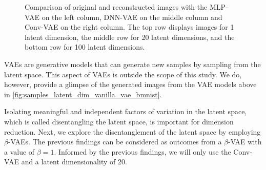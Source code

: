 \begin{figure}[!htb]
\qquad
{}
\caption{Comparison of original and reconstructed images with the MLP-VAE on the left column, DNN-VAE on the middle column and Conv-VAE on the right column. The top row displays images for 1 latent dimension, the middle row for 20 latent dimensions, and the bottom row for 100 latent dimensions.}
\label{fig:recon_latent_dim_vanilla_vae_bmnist}
\end{figure}

VAEs are generative models that can generate new samples by sampling from the latent space. This aspect of VAEs is outside the scope of this study. We do, however, provide a glimpse of the generated images from the VAE models above in \autoref{fig:samples_latent_dim_vanilla_vae_bmnist}.

\FloatBarrier

Isolating meaningful and independent factors of variation in the latent space, which is called disentangling the latent space, is important for dimension reduction. Next, we explore the disentanglement of the latent space by employing $\beta$-VAEs. The previous findings can be considered as outcomes from a $\beta$-VAE with a value of $\beta=1$. Informed by the previous findings, we will only use the Conv-VAE and a latent dimensionality of 20. 

